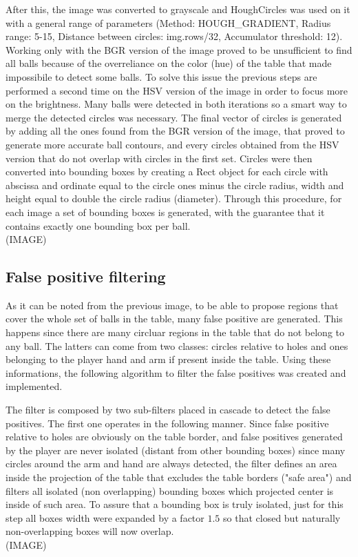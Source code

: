 After this, the image was converted to grayscale and HoughCircles was used on it with a general range
of parameters (Method: HOUGH\_GRADIENT, Radius range: 5-15, Distance between circles: img.rows/32, Accumulator threshold: 12).
Working only with the BGR version of the image proved to be unsufficient to find all balls because of the 
overreliance on the color (hue) of the table that made impossibile to detect some balls. To solve this issue
the previous steps are performed a second time on the HSV version of the image in order to focus more on 
the brightness. 
Many balls were detected in both iterations so a smart way to merge the detected circles was necessary.
The final vector of circles is generated by adding all the ones found from the BGR version of the image, that proved 
to generate more accurate ball contours, and every circles obtained from the HSV version that do not overlap with circles
in the first set.  
Circles were then converted into bounding boxes by creating a Rect object for each circle with abscissa and ordinate equal to the circle ones minus the circle radius,
width and height equal to double the circle radius (diameter).
Through this procedure, for each image a set of bounding boxes is generated, with the guarantee that it contains exactly one bounding box per ball. \\
(IMAGE)


\subsection*{False positive filtering}
As it can be noted from the previous image, to be able to propose regions that cover the whole set of balls in the table, many 
false positive are generated. This happens since there are many circluar regions in the table that do not belong to any ball.
The latters can come from two classes: circles relative to holes and ones belonging to the player hand and arm if present 
inside the table. Using these informations, the following algorithm to filter the false positives was created and implemented.

The filter is composed by two sub-filters placed in cascade to detect the false positives.
The first one operates in the following manner. Since false positive relative to holes are obviously on the table
border, and false positives generated by the player are never isolated (distant from other bounding boxes) since
many circles around the arm and hand are always detected, the filter defines an area inside the projection of the table that excludes
the table borders ("safe area") and filters all isolated (non overlapping) bounding boxes which projected center is inside of such area.
To assure that a bounding box is truly isolated, just for this step all boxes width were expanded by a factor $1.5$ so that closed but naturally
non-overlapping boxes will now overlap. \\
(IMAGE)

